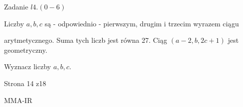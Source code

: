 \documentclass[a4paper,12pt]{article}
\begin{document}
Zadanie $l4. (0-6)$

Liczby $a, b, c$ są - odpowiednio - pierwszym, drugim i trzecim wyrazem ciągu

arytmetycznego. Suma tych liczb jest równa 27. Ciąg $(a-2,b,2c+1)$ jest geometryczny.

Wyznacz liczby $a, b, c.$

Strona 14 z18

MMA-IR
\end{document}
